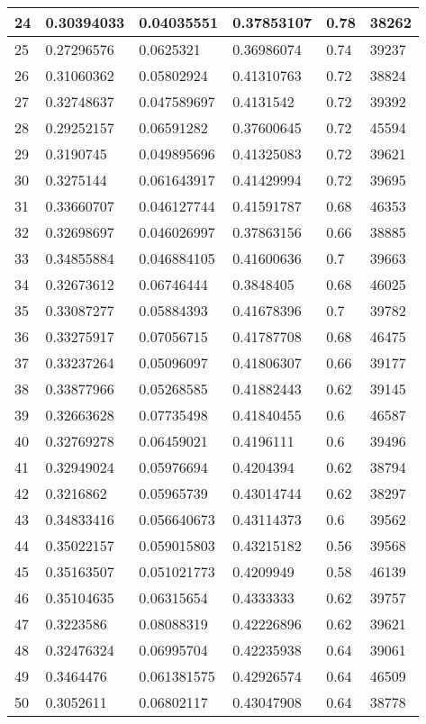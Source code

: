 \begin{longtable}{|l|l|l|l|l|l|}
24 & 0.30394033 & 0.04035551 & 0.37853107 & 0.78 & 38262 \\ \hline 
25 & 0.27296576 & 0.0625321 & 0.36986074 & 0.74 & 39237 \\ \hline 
26 & 0.31060362 & 0.05802924 & 0.41310763 & 0.72 & 38824 \\ \hline 
27 & 0.32748637 & 0.047589697 & 0.4131542 & 0.72 & 39392 \\ \hline 
28 & 0.29252157 & 0.06591282 & 0.37600645 & 0.72 & 45594 \\ \hline 
29 & 0.3190745 & 0.049895696 & 0.41325083 & 0.72 & 39621 \\ \hline 
30 & 0.3275144 & 0.061643917 & 0.41429994 & 0.72 & 39695 \\ \hline 
31 & 0.33660707 & 0.046127744 & 0.41591787 & 0.68 & 46353 \\ \hline 
32 & 0.32698697 & 0.046026997 & 0.37863156 & 0.66 & 38885 \\ \hline 
33 & 0.34855884 & 0.046884105 & 0.41600636 & 0.7 & 39663 \\ \hline 
34 & 0.32673612 & 0.06746444 & 0.3848405 & 0.68 & 46025 \\ \hline 
35 & 0.33087277 & 0.05884393 & 0.41678396 & 0.7 & 39782 \\ \hline 
36 & 0.33275917 & 0.07056715 & 0.41787708 & 0.68 & 46475 \\ \hline 
37 & 0.33237264 & 0.05096097 & 0.41806307 & 0.66 & 39177 \\ \hline 
38 & 0.33877966 & 0.05268585 & 0.41882443 & 0.62 & 39145 \\ \hline 
39 & 0.32663628 & 0.07735498 & 0.41840455 & 0.6 & 46587 \\ \hline 
40 & 0.32769278 & 0.06459021 & 0.4196111 & 0.6 & 39496 \\ \hline 
41 & 0.32949024 & 0.05976694 & 0.4204394 & 0.62 & 38794 \\ \hline 
42 & 0.3216862 & 0.05965739 & 0.43014744 & 0.62 & 38297 \\ \hline 
43 & 0.34833416 & 0.056640673 & 0.43114373 & 0.6 & 39562 \\ \hline 
44 & 0.35022157 & 0.059015803 & 0.43215182 & 0.56 & 39568 \\ \hline 
45 & 0.35163507 & 0.051021773 & 0.4209949 & 0.58 & 46139 \\ \hline 
46 & 0.35104635 & 0.06315654 & 0.4333333 & 0.62 & 39757 \\ \hline 
47 & 0.3223586 & 0.08088319 & 0.42226896 & 0.62 & 39621 \\ \hline 
48 & 0.32476324 & 0.06995704 & 0.42235938 & 0.64 & 39061 \\ \hline 
49 & 0.3464476 & 0.061381575 & 0.42926574 & 0.64 & 46509 \\ \hline 
50 & 0.3052611 & 0.06802117 & 0.43047908 & 0.64 & 38778 \\ \hline 
\end{longtable}